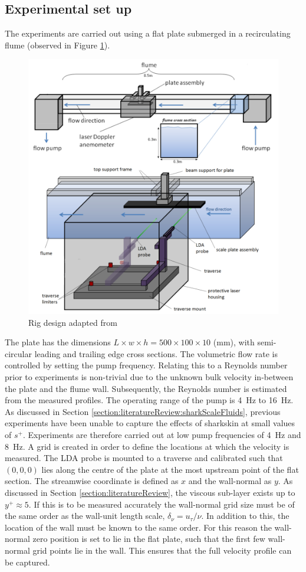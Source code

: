 \documentclass[12pt,oneside,a4paper]{article}
\begin{document}
\subsection{Experimental set up}
\label{section:experiments:setUp}
The experiments are carried out using a flat plate submerged in a recirculating flume (observed in Figure \ref{figure:experiments:setUp}).
%
\begin{figure}[!b]
\centering
\includegraphics[width = 12cm]{images/LDA_theoryImages/expSetUp.png}
\caption{Rig design adapted from \cite{fletcher2014phd}}
\label{figure:experiments:setUp}
\end{figure}
%
The plate has the dimensions $L \times w \times h = 500 \times 100 \times 10 $ (mm), with semi-circular leading and trailing edge cross sections. The volumetric flow rate is controlled by setting the pump frequency. Relating this to a Reynolds number prior to experiments is non-trivial due to the unknown bulk velocity in-between the plate and the flume wall. Subsequently, the Reynolds number is estimated from the measured profiles. The operating range of the pump is \SI{4}{Hz} to \SI{16}{Hz}. As discussed in Section \ref{section:literatureReview:sharkScaleFluids}, previous experiments have been unable to capture the effects of sharkskin at small values of $s^+$. Experiments are therefore carried out at low pump frequencies of \SI{4}{Hz} and \SI{8}{Hz}. A grid is created in order to define the locations at which the velocity is measured. The LDA probe is mounted to a traverse and calibrated such that $(0,0,0)$ lies along the centre of the plate at the most upstream point of the flat section. The streamwise coordinate is defined as $x$ and the wall-normal as $y$. As discussed in Section \ref{section:literatureReview}, the viscous sub-layer exists up to $y^+ \approx 5$. If this is to be measured accurately the wall-normal grid size must be of the same order as the wall-unit length scale, $\delta_\nu = u_\tau / \nu$. In addition to this, the location of the wall must be known to the same order. For this reason the wall-normal zero position is set to lie in the flat plate, such that the first few wall-normal grid points lie in the wall. This ensures that the full velocity profile can be captured.
\end{document}
